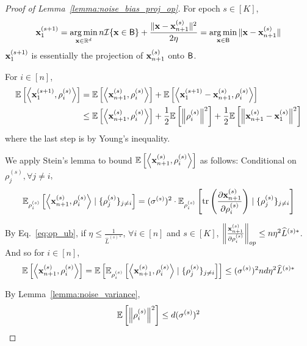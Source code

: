 \begin{proof}[Proof of Lemma~\ref{lemma:noise_bias_proj_op}]

For epoch $s\in [K]$,
\begin{align}
    {\mathbf{x}}_1^{(s+1)} = \operatorname*{arg\,min}_{{\mathbf{x}}\in \mathbb{R}^{d}} n {\mathcal{I}}\{{\mathbf{x}} \in {\mathsf{B}}\} + \frac{\|{\mathbf{x}} - {\mathbf{x}}_{n+1}^{(s)}\|^2}{2 \eta}
    = \operatorname*{arg\,min}_{{\mathbf{x}} \in {\mathsf{B}}} \|{\mathbf{x}} - {\mathbf{x}}_{n+1}^{(s)}\|
\end{align}
${\mathbf{x}}_{1}^{(s+1)}$ is essentially the projection of ${\mathbf{x}}_{n+1}^{(s)}$ onto ${\mathsf{B}}$.

For $i\in [n]$, 
\begin{align}
    \mathbb{E}\left[\left\langle {\mathbf{x}}_{1}^{(s+1)}, \rho_i^{(s)} \right\rangle \right]
    &= \mathbb{E}\left[\left\langle {\mathbf{x}}_{n+1}^{(s)}, \rho_i^{(s)} \right\rangle\right] + \mathbb{E}\left[\left\langle {\mathbf{x}}_{1}^{(s+1)} - {\mathbf{x}}_{n+1}^{(s)}, \rho_i^{(s)} \right\rangle\right]\\
    &\leq \mathbb{E}\left[\left\langle {\mathbf{x}}_{n+1}^{(s)}, \rho_i^{(s)} \right\rangle\right]
    + \frac{1}{2}\mathbb{E}\left[\left\| \rho_i^{(s)}\right\|^2\right]
    + \frac{1}{2}\mathbb{E}\left[\left\| {\mathbf{x}}_{n+1}^{(s)} - {\mathbf{x}}_{1}^{(s)}\right\|^2 \right]
\end{align}
where the last step is by Young's inequality.


We apply Stein's lemma to bound $\mathbb{E}\left[\left\langle {\mathbf{x}}_{n+1}^{(s)}, \rho_i^{(s)} \right\rangle\right]$ as follows: Conditional on $\rho_{j}^{(s)}, \forall j\neq i$,
\begin{align}
    \mathbb{E}_{\rho_i^{(s)}}\left[\left\langle {\mathbf{x}}_{n+1}^{(s)}, \rho_i^{(s)} \right\rangle \mid \{\rho_j^{(s)}\}_{j\neq i}\right]
    = (\sigma^{(s)})^2\cdot \mathbb{E}_{\rho_i^{(s)}}\left[\text{tr}\left( \frac{\partial {\mathbf{x}}_{n+1}^{(s)}}{\partial \rho_i^{(s)}}\right) \mid \{\rho_j^{(s)}\}_{j\neq i}\right]
\end{align}

By Eq.~\ref{eq:op_ub}, if $\eta \leq \frac{1}{\widehat{L}^{(s)*}}$, $\forall i \in [n]$ and $s\in [K]$, $\left\| \frac{{\mathbf{x}}_{n+1}^{(s)}}{\partial \rho_i^{(s)}} \right\|_{op}
\leq n \eta^2 \widehat{L}^{(s)*}$. And so for $i\in [n]$,
\begin{align}
\label{eq:noise_bias_reg_proj_t1}
    \mathbb{E}\left[\left\langle {\mathbf{x}}_{n+1}^{(s)}, \rho_i^{(s)}\right\rangle\right]
    = \mathbb{E}\left[\mathbb{E}_{\rho_i^{(s)}}\left[ \left\langle {\mathbf{x}}_{n+1}^{(s)}, \rho_i^{(s)} \right\rangle \mid \{\rho_j^{(s)}\}_{j\neq i}\right]\right]
    \leq (\sigma^{(s)})^2 nd \eta^2 \widehat{L}^{(s)*}
\end{align}

By Lemma~\ref{lemma:noise_variance}, 
\begin{align}
\label{eq:noise_bias_reg_proj_t2}
    \mathbb{E}\left[\left\|\rho_i^{(s)} \right\|^2\right] \leq d (\sigma^{(s)})^2
\end{align}


\end{proof}
